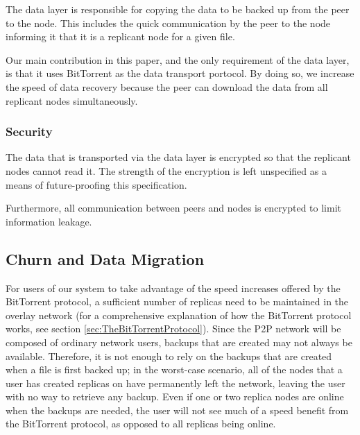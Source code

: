 \documentclass[12pt]{report}
\begin{document}
The data layer is responsible for copying the data to be backed up from the peer to the node. This includes the quick communication by the peer to the node informing it that it is a replicant node for a given file.

Our main contribution in this paper, and the only requirement of the data layer, is that it uses BitTorrent as the data transport portocol. By doing so, we increase the speed of data recovery because the peer can download the data from all replicant nodes simultaneously.

\subsubsection{Security}

The data that is transported via the data layer is encrypted so that the replicant nodes cannot read it. The strength of the encryption is left unspecified as a means of future-proofing this specification.

Furthermore, all communication between peers and nodes is encrypted to limit information leakage.

\subsection{Churn and Data Migration} \label{sec:ChurnandDataMigration_DataExchange}

For users of our system to take advantage of the speed increases offered by the BitTorrent protocol, a sufficient number of replicas need to be maintained in the overlay network (for a comprehensive explanation of how the BitTorrent protocol works, see section \ref{sec:TheBitTorrentProtocol}). Since the P2P network will be composed of ordinary network users, backups that are created may not always be available. Therefore, it is not enough to rely on the backups that are created when a file is first backed up; in the worst-case scenario, all of the nodes that a user has created replicas on have permanently left the network, leaving the user with no way to retrieve any backup. Even if one or two replica nodes are online when the backups are needed,  the user will not see much of a speed benefit from the BitTorrent protocol, as opposed to all replicas being online.
\end{document}
